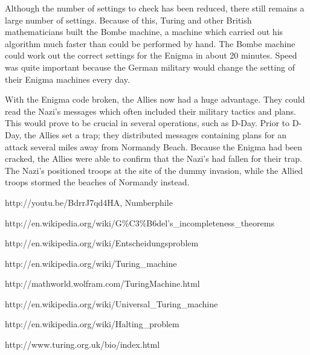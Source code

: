 \documentclass[12pt]{article}
\theoremstyle{mystyle}
\begin{document}
Although the number of settings to check has been reduced, there still remains a
large number of settings. Because of this, Turing and other British
mathematicians built the Bombe machine, a machine which carried out his
algorithm much faster than could be performed by hand. The Bombe machine could 
work out the correct settings for the Enigma in about 20 minutes. Speed was
quite important because the German military would change the setting of their
Enigma machines every day.

 With the Enigma code broken, the Allies now had a huge advantage.
They could read the Nazi's messages which often included their military tactics and plans. 
This would prove to be crucial in several operations, such as D-Day. Prior to
D-Day, the Allies set a trap; they distributed messages containing plans for an
attack several miles away from Normandy Beach. Because the Enigma had been
cracked, the Allies were able to confirm that the Nazi's had fallen for their
trap. The Nazi's positioned troops at the site of the dummy invasion, while the
Allied troops stormed the beaches of Normandy instead.


\begin{thebibliography}{9}

http://youtu.be/BdrrJ7qd4HA,
Numberphile

\bibitem{}
http://en.wikipedia.org/wiki/G\%C3\%B6del's\_incompleteness\_theorems

\bibitem{}
http://en.wikipedia.org/wiki/Entscheidungsproblem

\bibitem{}
http://en.wikipedia.org/wiki/Turing\_machine

\bibitem{}
http://mathworld.wolfram.com/TuringMachine.html

\bibitem{}
http://en.wikipedia.org/wiki/Universal\_Turing\_machine

\bibitem{}
http://en.wikipedia.org/wiki/Halting\_problem

\bibitem{}
http://www.turing.org.uk/bio/index.html

\end{thebibliography}
\end{document}
